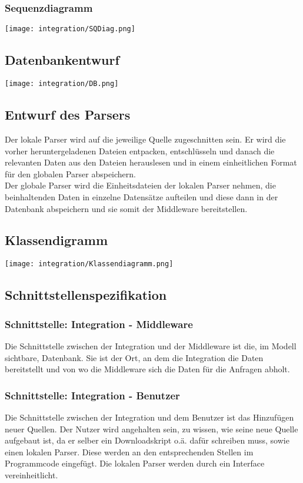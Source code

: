 \subsubsection{Sequenzdiagramm}
\texttt{[image: integration/SQDiag.png]}
\subsection{Datenbankentwurf}
\texttt{[image: integration/DB.png]}
\subsection{Entwurf des Parsers}
Der lokale Parser wird auf die jeweilige Quelle zugeschnitten sein. Er wird die vorher heruntergeladenen Dateien entpacken, entschlüsseln und danach die relevanten Daten aus den Dateien herauslesen und in einem einheitlichen Format für den globalen Parser abspeichern.\\
Der globale Parser wird die Einheitsdateien der lokalen Parser nehmen, die beinhaltenden Daten in einzelne Datensätze aufteilen und diese dann in der Datenbank abspeichern und sie somit der Middleware bereitstellen.
\subsection{Klassendigramm}
\texttt{[image: integration/Klassendiagramm.png]}
\subsection{Schnittstellenspezifikation}
\subsubsection{Schnittstelle: Integration - Middleware}
Die Schnittstelle zwischen der Integration und der Middleware ist die, im Modell sichtbare, Datenbank. Sie ist der Ort, an dem die Integration die Daten bereitstellt und von wo die Middleware sich die Daten für die Anfragen abholt.
\subsubsection{Schnittstelle: Integration - Benutzer}
Die Schnittstelle zwischen der Integration und dem Benutzer ist das Hinzufügen neuer Quellen. Der Nutzer wird angehalten sein, zu wissen, wie seine neue Quelle aufgebaut ist, da er selber ein Downloadskript o.ä. dafür schreiben muss, sowie einen lokalen Parser. Diese werden an den entsprechenden Stellen im Programmcode eingefügt. Die lokalen Parser werden durch ein Interface vereinheitlicht.
